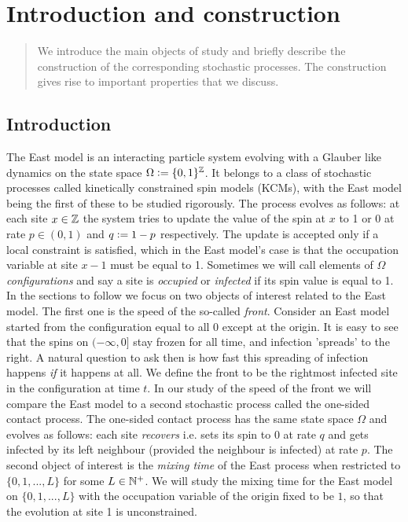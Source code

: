 \section{Introduction and construction}\label{dec:introduction}

\begin{quote}
{\small We introduce the main objects of study and briefly describe the construction of the corresponding stochastic processes. The construction gives rise to important properties that we discuss. }
\end{quote}

\subsection{Introduction}\label{ssec:introduction}
The East model is an interacting particle system evolving with a Glauber like dynamics on the state space $\Omega \vcentcolon= \{0,1\}^{\mathbb{Z}}$. It belongs to a class of stochastic processes called kinetically constrained spin models (KCMs), with the East model being the first of these to be studied rigorously. The process evolves as follows: at each site $x \in \mathbb{Z}$ the system tries to update the value of the spin at $x$ to 1 or 0 at rate $p \in (0,1)$ and $q \vcentcolon= 1 - p$ respectively. The update is accepted only if a local constraint is satisfied, which in the East model's case is that the occupation variable at site $x-1$ must be equal to 1. Sometimes we will call elements of $\Omega$ \textit{configurations} and say a site is \textit{occupied} or \textit{infected} if its spin value is equal to 1. \\

In the sections to follow we focus on two objects of interest related to the East model. The first one is the speed of the so-called \textit{front}. Consider an East model started from the configuration equal to all 0 except at the origin. It is easy to see that the spins on $(-\infty, 0]$ stay frozen for all time, and infection 'spreads' to the right. A natural question to ask then is how fast this spreading of infection happens \textit{if} it happens at all. We define the front to be the rightmost infected site in the configuration at time $t$. In our study of the speed of the front we will compare the East model to a second stochastic process called the one-sided contact process. The one-sided contact process has the same state space $\Omega$ and evolves as follows: each site \textit{recovers} i.e. sets its spin to 0 at rate $q$ and gets infected by its left neighbour (provided the neighbour is infected) at rate $p$. The second object of interest is the \textit{mixing time} of the East process when restricted to $\{ 0, 1, ..., L\}$ for some $L \in \mathbb{N}^+$. We will study the mixing time for the East model on $\{ 0, 1, ..., L\}$ with the occupation variable of the origin fixed to be $1$, so that the evolution at site 1 is unconstrained. \\


